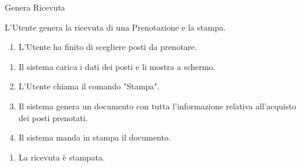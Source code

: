 {\ucTable	%
	{	%
		Genera Ricevuta
		
	}{	%
		
	}{	%
		L'Utente genera la ricevuta di una Prenotazione e la stampa.
		
	}{	%
		\attori
	}{	%
		\begin{enumerate}
			\item L'Utente ha finito di scegliere posti da prenotare.
		\end{enumerate}
		
	}{	%
		\begin{enumerate}
			\item Il sistema carica i dati dei posti e li mostra a schermo.
			\item L'Utente chiama il comando "Stampa".
            \item Il sistema genera un documento con tutta l'informazione relativa all'acquisto dei posti prenotati.
            \item Il sistema manda in stampa il documento.
		\end{enumerate}
		
	}{	%
		\begin{enumerate}
			\item La ricevuta è stampata.
		\end{enumerate}
		
	}{	%
} }
